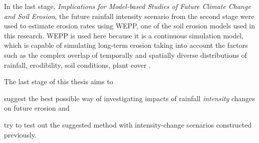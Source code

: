 In the last stage, \textsl{Implications for Model-based Studies of Future
Climate Change and Soil Erosion}, the future rainfall intensity scenario from
the second stage were used to estimate erosion rates using WEPP, one of the soil
erosion models used in this research. WEPP is used here because it is a
continuous simulation model, which is capable of simulating long-term erosion
taking into account the factors such as the complex overlap of temporally and
spatially diverse distributions of rainfall, erodibility, soil conditions, plant
cover \citep{nearing2006-145}.

The last stage of this thesis aims to
\begin{inparaenum}[1)]
  \item suggest the best possible way of investigating impacts of rainfall
\textit{intensity} changes on future erosion and
  \item try to test out the suggested method with intensity-change scenarios
constructed previously.
\end{inparaenum}


